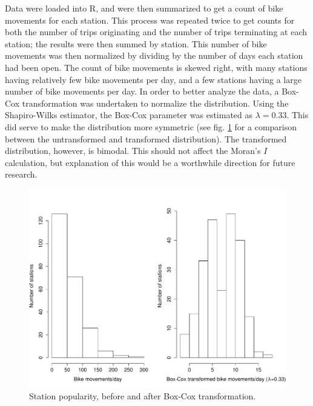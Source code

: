 \documentclass[letterpaper,11pt]{article}
\begin{document}
Data were loaded into R, and were then summarized to get a count of
bike movements for each station. This process was repeated twice to
get counts for both the number of trips originating and the number of
trips terminating at each station; the results were then summed by
station. This number of bike movements was then normalized by dividing
by the number of days each station had been open. The count of bike
movements is skewed right, with many stations having relatively few
bike movements per day, and a few stations having a large number of
bike movements per day. In order to better analyze the data, a Box-Cox
transformation was undertaken to normalize the distribution. Using the
Shapiro-Wilks estimator, the Box-Cox parameter was estimated as
$\lambda = 0.33$. This did serve to make the distribution more
symmetric (see fig. \ref{fig:boxcox} for a comparison between the
untransformed and transformed distribution). The transformed
distribution, however, is bimodal. This should not affect the Moran's
$I$ calculation, but explanation of this would be a
worthwhile direction for future research.

\begin{figure}[t]
  \includegraphics[width=\textwidth]{boxcox.pdf}
  \caption{\label{fig:boxcox}Station popularity, before and after Box-Cox transformation.}
\end{figure}
\end{document}
